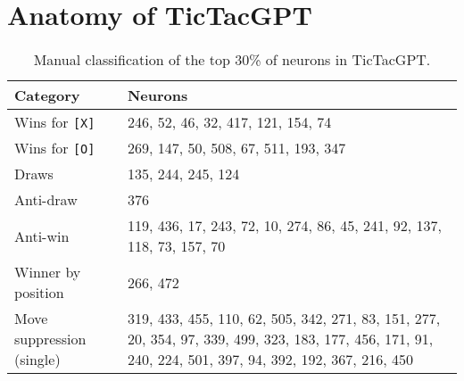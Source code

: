\documentclass{article}
\newcommand{\ttgpt}{TicTacGPT\xspace}
\begin{document}
\newpage



\newpage

\appendix

\section{Anatomy of \ttgpt}
\label{sec:anatomy}

\begin{table}[h]
    \centering
    \caption{Manual classification of the top 30\% of neurons in \ttgpt.}
    \begin{tabular}{p{}p{}}
        \toprule
        Category
         & Neurons                                                                                                                                                  \\
        \midrule
        Wins for \texttt{[X]}
         & 246, 52, 46, 32, 417, 121, 154, 74                                                                                                                       \\
        Wins for \texttt{[O]}
         & 269, 147, 50, 508, 67, 511, 193, 347                                                                                                                     \\
        Draws
         & 135, 244, 245, 124                                                                                                                                       \\
        Anti-draw
         & 376                                                                                                                                                      \\
        Anti-win
         & 119, 436, 17, 243, 72, 10, 274, 86, 45, 241, 92, 137, 118, 73, 157, 70                                                                                   \\
        Winner by position
         & 266, 472                                                                                                                                                 \\
        Move suppression (single)
         & 319, 433, 455, 110, 62, 505, 342, 271, 83, 151, 277, 20, 354, 97, 339, 499, 323, 183, 177, 456, 171, 91, 240, 224, 501, 397, 94, 392, 192, 367, 216, 450 \\

\end{tabular}
\end{table}
\end{document}
